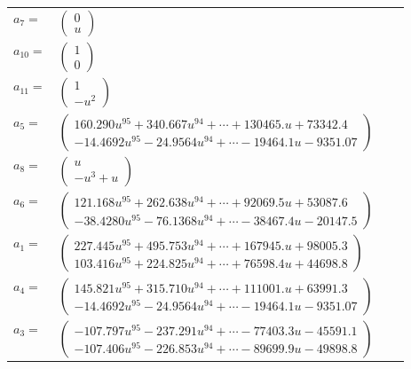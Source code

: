 \documentclass[1p]{elsarticle_modified}
\theoremstyle{definition}
\begin{document}
\begin{tabular}{m{7pt} m{180pt} m{7pt} m{180pt} }
\flushright $a_{7}=$&$\begin{pmatrix}0\\u\end{pmatrix}$ \\
\flushright $a_{10}=$&$\begin{pmatrix}1\\0\end{pmatrix}$ \\
\flushright $a_{11}=$&$\begin{pmatrix}1\\- u^2\end{pmatrix}$ \\
\flushright $a_{5}=$&$\begin{pmatrix}160.290 u^{95}+340.667 u^{94}+\cdots+130465. u+73342.4\\-14.4692 u^{95}-24.9564 u^{94}+\cdots-19464.1 u-9351.07\end{pmatrix}$ \\
\flushright $a_{8}=$&$\begin{pmatrix}u\\- u^3+u\end{pmatrix}$ \\
\flushright $a_{6}=$&$\begin{pmatrix}121.168 u^{95}+262.638 u^{94}+\cdots+92069.5 u+53087.6\\-38.4280 u^{95}-76.1368 u^{94}+\cdots-38467.4 u-20147.5\end{pmatrix}$ \\
\flushright $a_{1}=$&$\begin{pmatrix}227.445 u^{95}+495.753 u^{94}+\cdots+167945. u+98005.3\\103.416 u^{95}+224.825 u^{94}+\cdots+76598.4 u+44698.8\end{pmatrix}$ \\
\flushright $a_{4}=$&$\begin{pmatrix}145.821 u^{95}+315.710 u^{94}+\cdots+111001. u+63991.3\\-14.4692 u^{95}-24.9564 u^{94}+\cdots-19464.1 u-9351.07\end{pmatrix}$ \\
\flushright $a_{3}=$&$\begin{pmatrix}-107.797 u^{95}-237.291 u^{94}+\cdots-77403.3 u-45591.1\\-107.406 u^{95}-226.853 u^{94}+\cdots-89699.9 u-49898.8\end{pmatrix}$ \\

\end{tabular}
\end{document}
